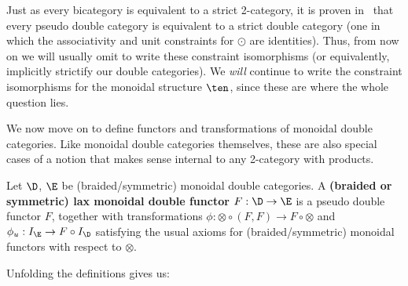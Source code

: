 Just as every bicategory is equivalent to a strict 2-category, it is
proven in~\cite{gp:double-limits} that every pseudo double category is
equivalent to a strict double category (one in which the associativity
and unit constraints for $\odot$ are identities).  Thus, from now on
we will usually omit to write these constraint isomorphisms (or
equivalently, implicitly strictify our double categories).  We
\emph{will} continue to write the constraint isomorphisms for the
monoidal structure $\ten$, since these are where the whole question
lies.

We now move on to define functors and transformations of monoidal double categories.
Like monoidal double categories themselves, these are also special cases of a notion that makes sense internal to any 2-category with products.

\begin{defn}\label{def:monfunc}
  Let $\D$, $\E$ be (braided/symmetric) monoidal double categories.  A {\bf (braided or symmetric) lax monoidal double functor} $F: \D \rightarrow \E$ is a pseudo double functor $F$, together with transformations $\phi : \otimes \circ (F,F) \rightarrow F \circ \otimes$ and $\phi_u:I_{\E}\rightarrow F \circ I_{\D}$ satisfying the usual axioms for (braided/symmetric) monoidal functors with respect to $\otimes$.
\end{defn}

Unfolding the definitions gives us:

